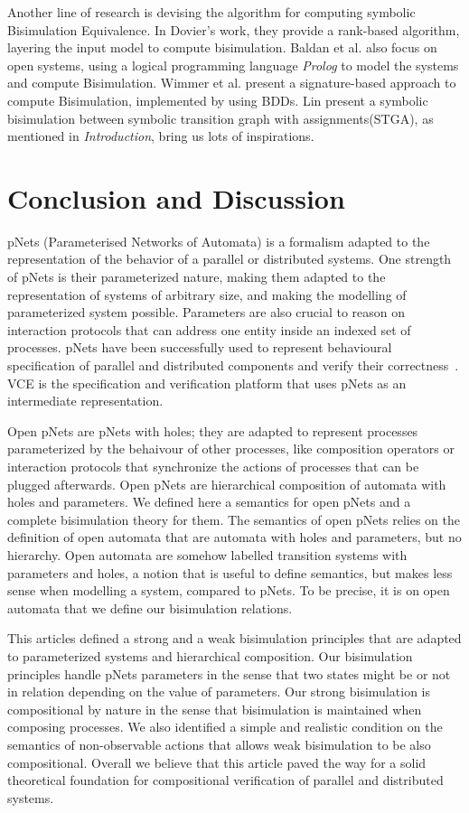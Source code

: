 \documentclass{lmcs}
\begin{document}
Another line of research is devising the algorithm for computing symbolic Bisimulation Equivalence.
In Dovier's work, they provide a rank-based algorithm, layering the input model to compute bisimulation\cite{dovier2002rank}. 
Baldan et al. also focus on open systems, using a logical programming language \emph{Prolog} to model the systems and compute Bisimulation\cite{baldan2001compositional}.
Wimmer et al. present a signature-based approach to compute Bisimulation, implemented by using BDDs\cite{wimmer2006sigref}.
Lin present a symbolic bisimulation between symbolic transition graph with assignments(STGA), as mentioned in \emph{Introduction}, bring us lots of inspirations.

\section{Conclusion and Discussion}
\label{section:conclusion}
 pNets (Parameterised Networks of Automata) is a formalism adapted to the representation of the behavior of a parallel or distributed systems. One  strength of pNets is their parameterized nature, making them adapted to the representation of systems of arbitrary size, and making the modelling of parameterized system possible. Parameters are also crucial to reason on interaction protocols that can address one entity inside an indexed set of processes. pNets have been successfully used to represent behavioural specification of parallel and distributed components and verify their correctness~\cite{AmeurBoulifa2017,HKM-FASE16}. VCE is the specification and verification platform that uses pNets as an intermediate representation.

Open pNets are pNets with holes; they are adapted to represent processes parameterized by the behaivour of other processes, like composition operators or interaction 
protocols that synchronize the actions of processes that can be plugged afterwards. Open
pNets are hierarchical composition of automata with holes and parameters. We
defined here a semantics for open pNets and a complete bisimulation theory for them. 
The semantics of open pNets relies on the definition of open automata that are automata with holes and parameters, but no hierarchy. Open automata are somehow labelled transition systems with parameters and holes, a notion that is useful to define semantics, but makes less sense when modelling a system, compared to pNets. To be precise, it is on open automata that we define our bisimulation relations.

This articles defined a strong and a weak bisimulation principles that are adapted to parameterized systems and hierarchical composition. Our bisimulation principles handle pNets parameters in the sense that two states might be or not in relation depending on the value of parameters. Our strong  bisimulation is compositional by nature in the sense that bisimulation is maintained when composing processes. We also identified a simple and realistic condition on the semantics of non-observable actions that allows weak bisimulation to be also compositional. Overall we believe that this article paved the way for a solid theoretical foundation for compositional verification of parallel and distributed systems.
\end{document}
